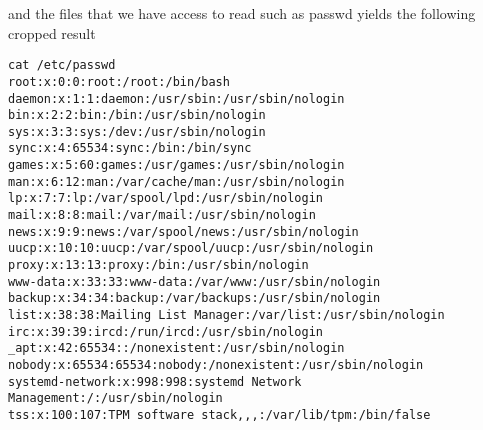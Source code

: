 \documentclass[notitlepage]{article}
\begin{document}
        and the files that we have access to read such as passwd yields the following cropped result
        \begin{verbatim}
cat /etc/passwd
root:x:0:0:root:/root:/bin/bash
daemon:x:1:1:daemon:/usr/sbin:/usr/sbin/nologin
bin:x:2:2:bin:/bin:/usr/sbin/nologin
sys:x:3:3:sys:/dev:/usr/sbin/nologin
sync:x:4:65534:sync:/bin:/bin/sync
games:x:5:60:games:/usr/games:/usr/sbin/nologin
man:x:6:12:man:/var/cache/man:/usr/sbin/nologin
lp:x:7:7:lp:/var/spool/lpd:/usr/sbin/nologin
mail:x:8:8:mail:/var/mail:/usr/sbin/nologin
news:x:9:9:news:/var/spool/news:/usr/sbin/nologin
uucp:x:10:10:uucp:/var/spool/uucp:/usr/sbin/nologin
proxy:x:13:13:proxy:/bin:/usr/sbin/nologin
www-data:x:33:33:www-data:/var/www:/usr/sbin/nologin
backup:x:34:34:backup:/var/backups:/usr/sbin/nologin
list:x:38:38:Mailing List Manager:/var/list:/usr/sbin/nologin
irc:x:39:39:ircd:/run/ircd:/usr/sbin/nologin
_apt:x:42:65534::/nonexistent:/usr/sbin/nologin
nobody:x:65534:65534:nobody:/nonexistent:/usr/sbin/nologin
systemd-network:x:998:998:systemd Network Management:/:/usr/sbin/nologin
tss:x:100:107:TPM software stack,,,:/var/lib/tpm:/bin/false
        \end{verbatim}
\end{document}
